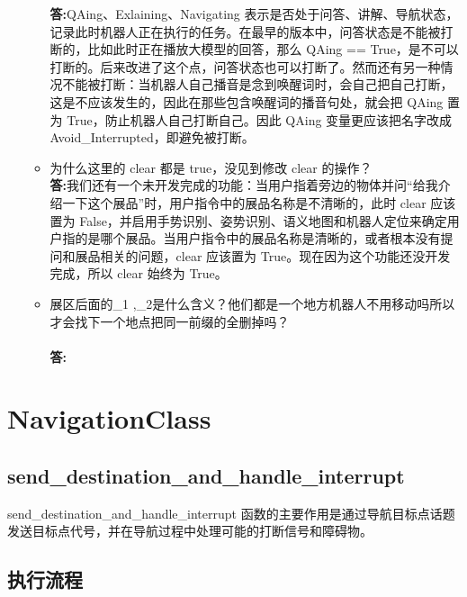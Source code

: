 \documentclass[]{article}
\begin{document}
\begin{itemize}
\begin{itemize}
	\textbf{答:}QAing、Exlaining、Navigating 表示是否处于问答、讲解、导航状态，记录此时机器人正在执行的任务。在最早的版本中，问答状态是不能被打断的，比如此时正在播放大模型的回答，那么 QAing == True，是不可以打断的。后来改进了这个点，问答状态也可以打断了。然而还有另一种情况不能被打断：当机器人自己播音是念到唤醒词时，会自己把自己打断，这是不应该发生的，因此在那些包含唤醒词的播音句处，就会把 QAing 置为 True，防止机器人自己打断自己。因此 QAing 变量更应该把名字改成 Avoid\_Interrupted，即避免被打断。
	
	\item 为什么这里的 clear 都是 true，没见到修改 clear 的操作？\\
	
	\textbf{答:}我们还有一个未开发完成的功能：当用户指着旁边的物体并问“给我介绍一下这个展品”时，用户指令中的展品名称是不清晰的，此时 clear 应该置为 False，并启用手势识别、姿势识别、语义地图和机器人定位来确定用户指的是哪个展品。当用户指令中的展品名称是清晰的，或者根本没有提问和展品相关的问题，clear 应该置为 True。现在因为这个功能还没开发完成，所以 clear 始终为 True。
	\item \textcolor{mycolor}{展区后面的\_1 ,\_2是什么含义？他们都是一个地方机器人不用移动吗所以才会找下一个地点把同一前缀的全删掉吗？}\\ \\
	\textbf{答:}
\end{itemize}
\end{itemize}
\section{NavigationClass}
\subsection{send\_destination\_and\_handle\_interrupt}
send\_destination\_and\_handle\_interrupt 函数的主要作用是通过导航目标点话题发送目标点代号，并在导航过程中处理可能的打断信号和障碍物。
\subsection{执行流程}
\end{document}
